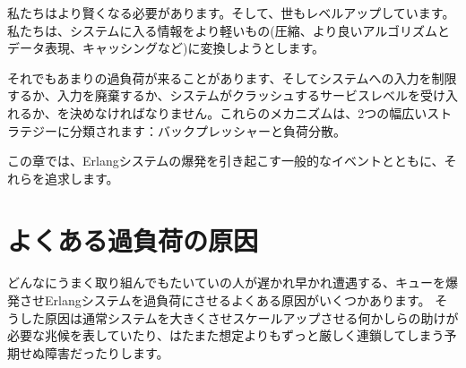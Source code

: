 私たちはより賢くなる必要があります。そして、世もレベルアップしています。私たちは、システムに入る情報をより軽いもの(圧縮、より良いアルゴリズムとデータ表現、キャッシングなど)に変換しようとします。

それでもあまりの過負荷が来ることがあります、そしてシステムへの入力を制限するか、入力を廃棄するか、システムがクラッシュするサービスレベルを受け入れるか、を決めなければなりません。これらのメカニズムは、2つの幅広いストラテジーに分類されます：バックプレッシャーと負荷分散。

この章では、Erlangシステムの爆発を引き起こす一般的なイベントとともに、それらを追求します。

\section{よくある過負荷の原因}

どんなにうまく取り組んでもたいていの人が遅かれ早かれ遭遇する、キューを爆発させErlangシステムを過負荷にさせるよくある原因がいくつかあります。
そうした原因は通常システムを大きくさせスケールアップさせる何かしらの助けが必要な兆候を表していたり、はたまた想定よりもずっと厳しく連鎖してしまう予期せぬ障害だったりします。

